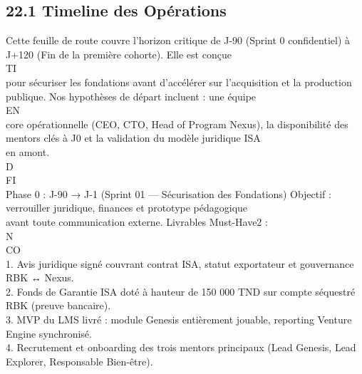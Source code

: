 \subsection{22.1 Timeline des Opérations}
Cette feuille de route couvre l’horizon critique de J-90 (Sprint 0 confidentiel) à J+120 (Fin de la première cohorte). Elle est conçue\\
\vspace{0.5em}
\vspace{0.5em}
\vspace{0.5em}
\vspace{0.5em}
TI\\
pour sécuriser les fondations avant d’accélérer sur l’acquisition et la production publique. Nos hypothèses de départ incluent : une équipe\\
\vspace{0.5em}
\vspace{0.5em}
\vspace{0.5em}
\vspace{0.5em}
EN\\
core opérationnelle (CEO, CTO, Head of Program Nexus), la disponibilité des mentors clés à J0 et la validation du modèle juridique ISA\\
en amont.\\
\vspace{0.5em}
\vspace{0.5em}
\vspace{0.5em}
\vspace{0.5em}
D\\
FI\\
Phase 0 : J-90 → J-1 (Sprint 01 — Sécurisation des Fondations) Objectif : verrouiller juridique, finances et prototype pédagogique\\
avant toute communication externe. Livrables Must-Have2 :\\
N\\
CO\\
1. Avis juridique signé couvrant contrat ISA, statut exportateur et gouvernance RBK ↔ Nexus.\\
\vspace{0.5em}
2. Fonds de Garantie ISA doté à hauteur de 150 000 TND sur compte séquestré RBK (preuve bancaire).\\
\vspace{0.5em}
3. MVP du LMS livré : module Genesis entièrement jouable, reporting Venture Engine synchronisé.\\
\vspace{0.5em}
4. Recrutement et onboarding des trois mentors principaux (Lead Genesis, Lead Explorer, Responsable Bien-être).\\
